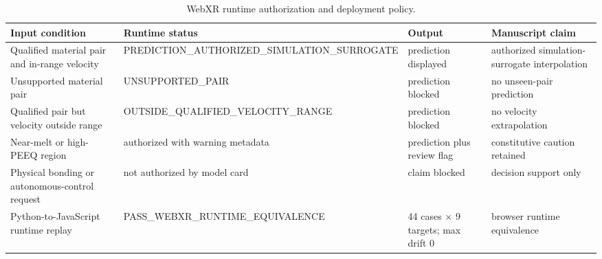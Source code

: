 \begin{table}[t]
\centering
\caption{WebXR runtime authorization and deployment policy.}
\label{tab:runtime_policy}
\begin{tabular}{llll}
\hline
Input condition & Runtime status & Output & Manuscript claim \\
\hline
Qualified material pair and in-range velocity & PREDICTION\_AUTHORIZED\_SIMULATION\_SURROGATE & prediction displayed & authorized simulation-surrogate interpolation \\
Unsupported material pair & UNSUPPORTED\_PAIR & prediction blocked & no unseen-pair prediction \\
Qualified pair but velocity outside range & OUTSIDE\_QUALIFIED\_VELOCITY\_RANGE & prediction blocked & no velocity extrapolation \\
Near-melt or high-PEEQ region & authorized with warning metadata & prediction plus review flag & constitutive caution retained \\
Physical bonding or autonomous-control request & not authorized by model card & claim blocked & decision support only \\
Python-to-JavaScript runtime replay & PASS\_WEBXR\_RUNTIME\_EQUIVALENCE & 44 cases $\times$ 9 targets; max drift 0 & browser runtime equivalence \\
\hline
\end{tabular}
\end{table}
